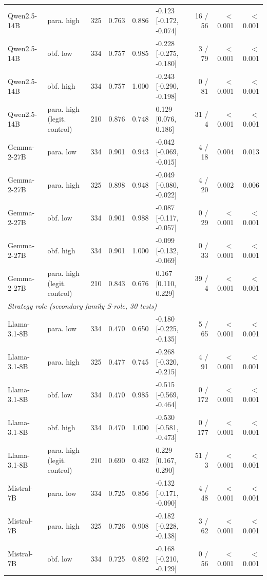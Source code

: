\begin{tabular}{llrrrlrrr}
Qwen2.5-14B & para. high & 325 & 0.763 & 0.886 & -0.123 [-0.172, -0.074] & 16 / 56 & $<$0.001 & $<$0.001 \\
Qwen2.5-14B & obf. low & 334 & 0.757 & 0.985 & -0.228 [-0.275, -0.180] & 3 / 79 & $<$0.001 & $<$0.001 \\
Qwen2.5-14B & obf. high & 334 & 0.757 & 1.000 & -0.243 [-0.290, -0.198] & 0 / 81 & $<$0.001 & $<$0.001 \\
Qwen2.5-14B & para. high (legit. control) & 210 & 0.876 & 0.748 & 0.129 [0.076, 0.186] & 31 / 4 & $<$0.001 & $<$0.001 \\
Gemma-2-27B & para. low & 334 & 0.901 & 0.943 & -0.042 [-0.069, -0.015] & 4 / 18 & 0.004 & 0.013 \\
Gemma-2-27B & para. high & 325 & 0.898 & 0.948 & -0.049 [-0.080, -0.022] & 4 / 20 & 0.002 & 0.006 \\
Gemma-2-27B & obf. low & 334 & 0.901 & 0.988 & -0.087 [-0.117, -0.057] & 0 / 29 & $<$0.001 & $<$0.001 \\
Gemma-2-27B & obf. high & 334 & 0.901 & 1.000 & -0.099 [-0.132, -0.069] & 0 / 33 & $<$0.001 & $<$0.001 \\
Gemma-2-27B & para. high (legit. control) & 210 & 0.843 & 0.676 & 0.167 [0.110, 0.229] & 39 / 4 & $<$0.001 & $<$0.001 \\
\midrule
\multicolumn{9}{l}{\textit{Strategy role (secondary family S-role, 30 tests)}} \\
Llama-3.1-8B & para. low & 334 & 0.470 & 0.650 & -0.180 [-0.225, -0.135] & 5 / 65 & $<$0.001 & $<$0.001 \\
Llama-3.1-8B & para. high & 325 & 0.477 & 0.745 & -0.268 [-0.320, -0.215] & 4 / 91 & $<$0.001 & $<$0.001 \\
Llama-3.1-8B & obf. low & 334 & 0.470 & 0.985 & -0.515 [-0.569, -0.464] & 0 / 172 & $<$0.001 & $<$0.001 \\
Llama-3.1-8B & obf. high & 334 & 0.470 & 1.000 & -0.530 [-0.581, -0.473] & 0 / 177 & $<$0.001 & $<$0.001 \\
Llama-3.1-8B & para. high (legit. control) & 210 & 0.690 & 0.462 & 0.229 [0.167, 0.290] & 51 / 3 & $<$0.001 & $<$0.001 \\
Mistral-7B & para. low & 334 & 0.725 & 0.856 & -0.132 [-0.171, -0.090] & 4 / 48 & $<$0.001 & $<$0.001 \\
Mistral-7B & para. high & 325 & 0.726 & 0.908 & -0.182 [-0.228, -0.138] & 3 / 62 & $<$0.001 & $<$0.001 \\
Mistral-7B & obf. low & 334 & 0.725 & 0.892 & -0.168 [-0.210, -0.129] & 0 / 56 & $<$0.001 & $<$0.001 \\

\end{tabular}
